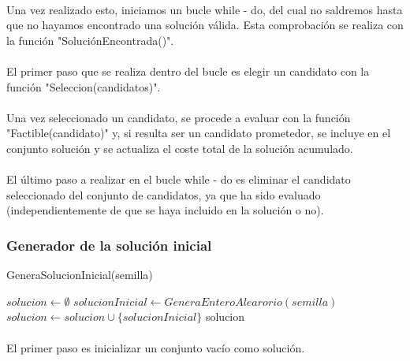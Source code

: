 \documentclass{article}
\begin{document}
	\paragraph{}Una vez realizado esto, iniciamos un bucle while - do, del cual no saldremos hasta que no hayamos encontrado una solución válida. Esta comprobación se realiza con la función "SoluciónEncontrada()".
	
	\paragraph{}El primer paso que se realiza dentro del bucle es elegir un candidato con la función "Seleccion(candidatos)".
	
	\paragraph{}Una vez seleccionado un candidato, se procede a evaluar con la función "Factible(candidato)" y, si resulta ser un candidato prometedor, se incluye en el conjunto solución y se actualiza el coste total de la solución acumulado.
	
	\paragraph{}El último paso a realizar en el bucle while - do es eliminar el candidato seleccionado del conjunto de candidatos, ya que ha sido evaluado (independientemente de que se haya incluido en la solución o no).
	
	
	
	\subsubsection{Generador de la solución inicial}
	\begin{algorithm}[H]
		\caption{GeneraSolucionInicial(semilla)}
		\begin{algorithmic}
			\STATE $solucion \leftarrow \emptyset$
			\STATE $solucionInicial \leftarrow GeneraEnteroAlearorio(semilla)$
			\STATE $solucion \leftarrow solucion \cup \{solucionInicial\}$
			\RETURN solucion
		\end{algorithmic}
	\end{algorithm}
	
	\paragraph{}El primer paso es inicializar un conjunto vacío como solución.
	
\end{document}
